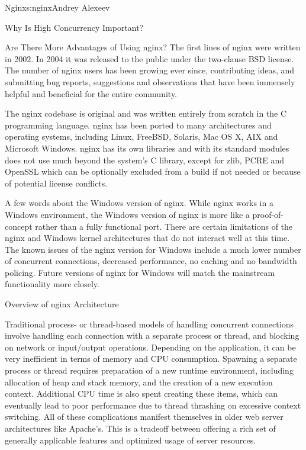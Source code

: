 \begin{aosachapter}{Nginx}{s:nginx}{Andrey Alexeev}
\begin{aosasect1}{Why Is High Concurrency Important?}
\begin{aosasect2}{Are There More Advantages of Using nginx?}
The first lines of nginx were written in 2002. In 2004 it was released
to the public under the two-clause BSD license. The number of nginx
users has been growing ever since, contributing ideas, and submitting
bug reports, suggestions and observations that have been immensely
helpful and beneficial for the entire community.

The nginx codebase is original and was written entirely from scratch
in the C programming language. nginx has been ported to many
architectures and operating systems, including Linux, FreeBSD,
Solaris, Mac OS X, AIX and Microsoft Windows. nginx has its own
libraries and with its standard modules does not use much beyond the
system's C library, except for zlib, PCRE and OpenSSL which can be
optionally excluded from a build if not needed or because of potential
license conflicts.

A few words about the Windows version of nginx. While nginx works in a
Windows environment, the Windows version of nginx is more like a
proof-of-concept rather than a fully functional port. There are
certain limitations of the nginx and Windows kernel architectures that
do not interact well at this time. The known issues of the nginx
version for Windows include a much lower number of concurrent
connections, decreased performance, no caching and no bandwidth
policing. Future versions of nginx for Windows will match the
mainstream functionality more closely.

\end{aosasect2}

\end{aosasect1}

\begin{aosasect1}{Overview of nginx Architecture}

Traditional process- or thread-based models of handling concurrent
connections involve handling each connection with a separate process
or thread, and blocking on network or input/output
operations. Depending on the application, it can be very inefficient
in terms of memory and CPU consumption. Spawning a separate process or
thread requires preparation of a new runtime environment, including
allocation of heap and stack memory, and the creation of a new
execution context. Additional CPU time is also spent creating these
items, which can eventually lead to poor performance due to thread
thrashing on excessive context switching. All of these complications
manifest themselves in older web server architectures like
Apache's. This is a tradeoff between offering a rich set of generally
applicable features and optimized usage of server resources.


\end{aosasect1}
\end{aosachapter}
